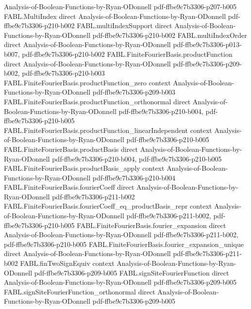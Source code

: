 \begin{theorem}
  {Analysis-of-Boolean-Functions-by-Ryan-ODonnell}
  {pdf-ffbe9c7b3306-p207-b005}
\proofstep
  {FABL.MultiIndex}
  {direct}
  {Analysis-of-Boolean-Functions-by-Ryan-ODonnell}
  {pdf-ffbe9c7b3306-p210-b002}
\proofstep
  {FABL.multiIndexSupport}
  {direct}
  {Analysis-of-Boolean-Functions-by-Ryan-ODonnell}
  {pdf-ffbe9c7b3306-p210-b002}
\proofstep
  {FABL.multiIndexOrder}
  {direct}
  {Analysis-of-Boolean-Functions-by-Ryan-ODonnell}
  {pdf-ffbe9c7b3306-p013-b007,
    pdf-ffbe9c7b3306-p210-b002}
\proofstep
  {FABL.FiniteFourierBasis.productFunction}
  {direct}
  {Analysis-of-Boolean-Functions-by-Ryan-ODonnell}
  {pdf-ffbe9c7b3306-p209-b002,
    pdf-ffbe9c7b3306-p210-b003}
\proofstep
  {FABL.FiniteFourierBasis.productFunction_zero}
  {context}
  {Analysis-of-Boolean-Functions-by-Ryan-ODonnell}
  {pdf-ffbe9c7b3306-p209-b003}
\proofstep
  {FABL.FiniteFourierBasis.productFunction_orthonormal}
  {direct}
  {Analysis-of-Boolean-Functions-by-Ryan-ODonnell}
  {pdf-ffbe9c7b3306-p210-b004,
    pdf-ffbe9c7b3306-p210-b005}
\proofstep
  {FABL.FiniteFourierBasis.productFunction_linearIndependent}
  {context}
  {Analysis-of-Boolean-Functions-by-Ryan-ODonnell}
  {pdf-ffbe9c7b3306-p210-b005}
\proofstep
  {FABL.FiniteFourierBasis.productBasis}
  {direct}
  {Analysis-of-Boolean-Functions-by-Ryan-ODonnell}
  {pdf-ffbe9c7b3306-p210-b004,
    pdf-ffbe9c7b3306-p210-b005}
\proofstep
  {FABL.FiniteFourierBasis.productBasis_apply}
  {context}
  {Analysis-of-Boolean-Functions-by-Ryan-ODonnell}
  {pdf-ffbe9c7b3306-p210-b004}
\proofstep
  {FABL.FiniteFourierBasis.fourierCoeff}
  {direct}
  {Analysis-of-Boolean-Functions-by-Ryan-ODonnell}
  {pdf-ffbe9c7b3306-p211-b002}
\proofstep
  {FABL.FiniteFourierBasis.fourierCoeff_eq_productBasis_repr}
  {context}
  {Analysis-of-Boolean-Functions-by-Ryan-ODonnell}
  {pdf-ffbe9c7b3306-p211-b002,
    pdf-ffbe9c7b3306-p210-b005}
\proofstep
  {FABL.FiniteFourierBasis.fourier_expansion}
  {direct}
  {Analysis-of-Boolean-Functions-by-Ryan-ODonnell}
  {pdf-ffbe9c7b3306-p211-b002,
    pdf-ffbe9c7b3306-p210-b005}
\proofstep
  {FABL.FiniteFourierBasis.fourier_expansion_unique}
  {direct}
  {Analysis-of-Boolean-Functions-by-Ryan-ODonnell}
  {pdf-ffbe9c7b3306-p211-b002}
\proofstep
  {FABL.finTwoSignEquiv}
  {context}
  {Analysis-of-Boolean-Functions-by-Ryan-ODonnell}
  {pdf-ffbe9c7b3306-p209-b005}
\proofstep
  {FABL.signSiteFourierFunction}
  {direct}
  {Analysis-of-Boolean-Functions-by-Ryan-ODonnell}
  {pdf-ffbe9c7b3306-p209-b005}
\proofstep
  {FABL.signSiteFourierFunction_orthonormal}
  {direct}
  {Analysis-of-Boolean-Functions-by-Ryan-ODonnell}
  {pdf-ffbe9c7b3306-p209-b005}

\end{theorem}
